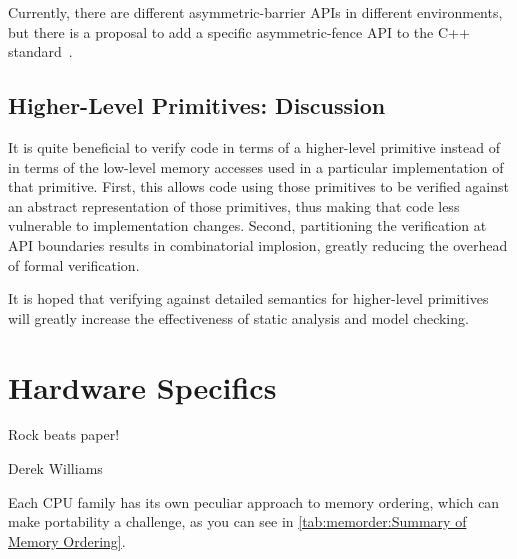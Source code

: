 Currently, there are different asymmetric-barrier APIs in different
environments, but there is a proposal to add a specific asymmetric-fence
API to the C++ standard~\cite{DavidGoldblatt2022asymmetricFences}.

\subsection{Higher-Level Primitives:
	    Discussion}
\label{sec:memorder:Higher-Level Primitives: Discussion}

It is quite beneficial to verify code in terms of a higher-level primitive
instead of in terms of the low-level memory accesses used in a particular
implementation of that primitive.
First, this allows code using those primitives to be
verified against an abstract representation of those primitives,
thus making that code less vulnerable to implementation changes.
Second, partitioning the verification at API boundaries results in
combinatorial implosion, greatly reducing the overhead of formal
verification.

It is hoped that verifying against detailed semantics for higher-level
primitives will greatly increase the effectiveness of static analysis
and model checking.

\section{Hardware Specifics}
\label{sec:memorder:Hardware Specifics}
%
\epigraph{Rock beats paper!}{Derek Williams}

Each CPU family has its own peculiar approach to memory ordering, which
can make portability a challenge, as you can see in
\cref{tab:memorder:Summary of Memory Ordering}.

